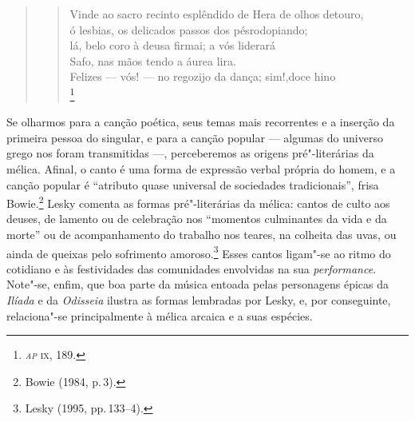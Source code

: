 \begin{quote}
\begin{verse}
Vinde ao sacro recinto esplêndido de Hera de olhos de\qb{}touro,\\
\hspace*{4.5em} ó lesbias, os delicados passos dos pés\qb{}rodopiando;\\
lá, belo coro à deusa firmai; a vós liderará\\
\hspace*{4.5em} Safo, nas mãos tendo a áurea lira.\\
Felizes --- vós! --- no regozijo da dança; sim!,\qb{}doce hino\\
\hspace*{4.5em} \footnote{\emph{\textsc{ap}} \textsc{ix}, 189.}
\end{verse}
\end{quote}

Se olharmos para a canção poética, seus temas mais recorrentes e a inserção da
primeira pessoa do singular, e para a canção popular --- algumas do universo grego nos
foram transmitidas ---, perceberemos as origens pré"-literárias da mélica. Afinal,
o canto é uma forma de expressão verbal própria do homem, e a canção popular é
“atributo quase universal de sociedades tradicionais”, frisa Bowie.\footnote{
Bowie (1984, p.\,3).} Lesky comenta as formas
pré"-literárias da mélica: cantos de culto aos deuses, de lamento ou de celebração
nos “momentos culminantes da vida e da morte” ou de acompanhamento do trabalho nos teares, na colheita das uvas, ou ainda de queixas pelo sofrimento amoroso.\footnote{ Lesky (1995, pp.\,133--4).} Esses cantos ligam"-se ao ritmo do
cotidiano e às festividades das comunidades envolvidas na sua
\emph{performance}. Note"-se, enfim, que boa parte da música entoada pelas
personagens épicas da \emph{Ilíada} e da \emph{Odisseia} ilustra as formas
lembradas por Lesky, e, por conseguinte, relaciona"-se principalmente à mélica
arcaica e a suas espécies.

